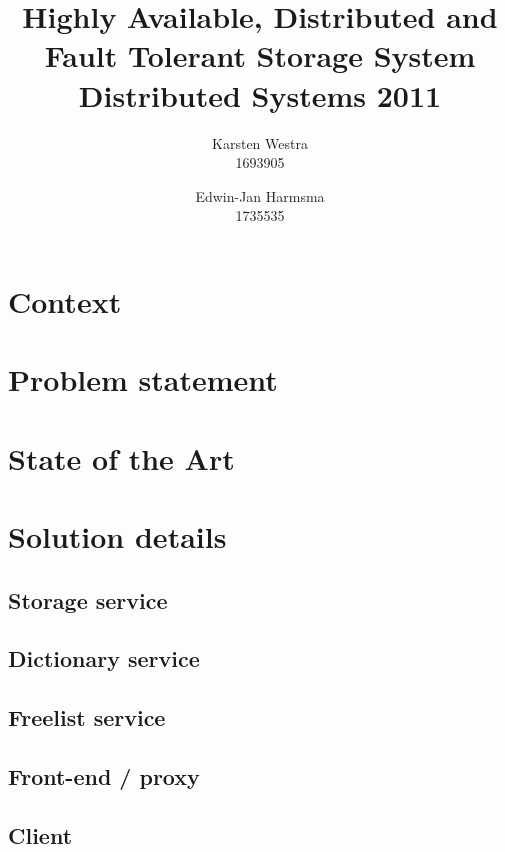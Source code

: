 \documentclass[12pt,a4paper]{scrartcl}
\title{\large{Highly Available, Distributed and Fault Tolerant Storage System} \\ \normalsize{Distributed Systems 2011}}
\author{Karsten Westra\\1693905 \and Edwin-Jan Harmsma\\1735535}
\begin{document}
\maketitle

\tableofcontents
\clearpage



\section{Context}

\section{Problem statement}

\section{State of the Art}

\section{Solution details}
\subsection{Storage service}
\subsection{Dictionary service}
\subsection{Freelist service}
\subsection{Front-end / proxy}
\subsection{Client}
\end{document}
